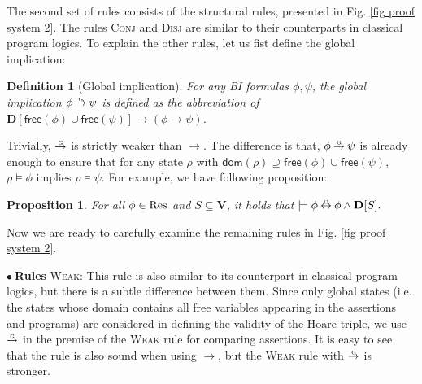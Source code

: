 \documentclass[conference,compsoc, 10pt]{IEEEtran}
\newcommand{\jh}[1]{\textit{\color{red}[JH] : #1}}
\newcommand{\lz}[1]{\textit{\color{blue}[LZ] : #1}}
\newtheorem{definition}{Definition}[section]
\newtheorem{proposition}{Proposition}[section]
\newcommand {\bD} {{\mathbf{D}}}
\newcommand {\dom }[1] {{\mathsf{dom}\!\left(#1\right)}}
\newcommand {\free }[1] {{\mathsf{free}\left(#1\right)}}
\newcommand {\vars } {\mathbf{V}}
\DeclareRobustCommand{\gimp}{%
	\mathbin{\ooalign{$\rightarrow$\cr\hss\raisebox{1ex}{\scalebox{.5}{G}}\hss}}}
\DeclareRobustCommand{\gimplr}{%
	\mathbin{\ooalign{$\leftrightarrow$\cr\hss\raisebox{1ex}{\scalebox{.5}{G}}\hss}}}
\begin{document}
	The second set of rules consists of the structural rules, presented in Fig. \ref{fig proof system 2}. %
	The rules \textsc{Conj} and \textsc{Disj} are similar to their counterparts in
  classical program logics. 	To explain the other rules,
let us fist define the global implication:		
		\begin{definition}[Global implication]
			For any BI formulas $\phi,\psi$, the global implication $\phi\gimp\psi$ is defined as the abbreviation of $\bD[\free{\phi}\cup\free{\psi}]\rightarrow(\phi\rightarrow\psi)$.
		\end{definition}
		Trivially, $\gimp$ is strictly weaker than $\rightarrow$. The difference is that, $\phi\gimp\psi$ is already enough to ensure that for any state $\rho$ with $\dom{\rho}\supseteq\free{\phi}\cup\free{\psi}$, $\rho\models\phi$ implies $\rho\models\psi$. For example, we have following proposition:
		\begin{proposition}
		    \label{prop glo imp}
				For all $\phi\in{\rm Res}$ and $S\subseteq \vars$, it holds that $\models \phi\gimplr \phi\wedge \bD[S].$	
		\end{proposition}
    
    Now we are ready to carefully examine the remaining rules in Fig. \ref{fig proof system 2}.  
	
	\vspace{0.2cm}
	
	\noindent$\bullet\ $\textbf{Rules} \textsc{Weak}:
 This rule is also similar to its counterpart in classical program logics, but there is a subtle difference between them.   Since only global states (i.e. the states whose domain
    contains all free variables appearing in the assertions and programs) are 
    considered in  defining the validity of the Hoare triple, we use  $\gimp$ in the premise of the \textsc{Weak} rule for comparing assertions. It is easy to see that the rule is also sound when using $\rightarrow$, but the  \textsc{Weak} rule with $\gimp$ is stronger. 

	
\end{document}
